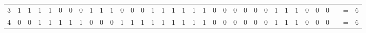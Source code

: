 \documentclass[a4paper,3p,times,authoryear]{elsarticle}
\begin{document}
\begin{table}[H]
{\begin{tabular}{|l|l|l|l|l|l|l|l|l|l|l|l|l|l|l|l|l|l|l|l|l|l|l|l|l|l|l|l|l|l|l|llll|}
\cline{1-32}\cline{34-35}
\multicolumn{1}{|c|}{3} & \multicolumn{1}{c|}{\cellcolor{blue!25}1} & \multicolumn{1}{c|}{\cellcolor{blue!25}1} & \multicolumn{1}{c|}{1} & \multicolumn{1}{c|}{1} & \multicolumn{1}{c|}{0} & \multicolumn{1}{c|}{0} & \multicolumn{1}{c|}{0} & \multicolumn{1}{c|}{\cellcolor{blue!25}1} & \multicolumn{1}{c|}{\cellcolor{blue!25}1} & \multicolumn{1}{c|}{\cellcolor{blue!25}1} & \multicolumn{1}{c|}{0} & \multicolumn{1}{c|}{0} & \multicolumn{1}{c|}{0} & \multicolumn{1}{c|}{\cellcolor{blue!25}1} & \multicolumn{1}{c|}{\cellcolor{blue!25}1} & \multicolumn{1}{c|}{\cellcolor{blue!25}1} & \multicolumn{1}{c|}{\cellcolor{blue!25}1} & \multicolumn{1}{c|}{\cellcolor{blue!25}1} & \multicolumn{1}{c|}{\cellcolor{blue!25}1} & \multicolumn{1}{c|}{0} & \multicolumn{1}{c|}{0} & \multicolumn{1}{c|}{0} & \multicolumn{1}{c|}{0} & \multicolumn{1}{c|}{0} & \multicolumn{1}{c|}{0} & \multicolumn{1}{c|}{\cellcolor{blue!25}1} & \multicolumn{1}{c|}{\cellcolor{blue!25}1} & \multicolumn{1}{c|}{\cellcolor{blue!25}1} & \multicolumn{1}{c|}{0} & \multicolumn{1}{c|}{0} & \multicolumn{1}{c}{0} & \multicolumn{1}{c}{} & \multicolumn{1}{c}{=} & \multicolumn{1}{c|}{\cellcolor{blue!25}6} \\ 
\cline{1-32}\cline{34-35}
\multicolumn{1}{|c|}{4} & \multicolumn{1}{c|}{0} & \multicolumn{1}{c|}{0} & \multicolumn{1}{c|}{\cellcolor{blue!25}1} & \multicolumn{1}{c|}{\cellcolor{blue!25}1} & \multicolumn{1}{c|}{\cellcolor{blue!25}1} & \multicolumn{1}{c|}{\cellcolor{blue!25}1} & \multicolumn{1}{c|}{\cellcolor{blue!25}1} & \multicolumn{1}{c|}{0} & \multicolumn{1}{c|}{0} & \multicolumn{1}{c|}{0} & \multicolumn{1}{c|}{\cellcolor{blue!25}1} & \multicolumn{1}{c|}{\cellcolor{blue!25}1} & \multicolumn{1}{c|}{\cellcolor{blue!25}1} & \multicolumn{1}{c|}{\cellcolor{blue!25}1} & \multicolumn{1}{c|}{\cellcolor{blue!25}1} & \multicolumn{1}{c|}{\cellcolor{blue!25}1} & \multicolumn{1}{c|}{\cellcolor{blue!25}1} & \multicolumn{1}{c|}{\cellcolor{blue!25}1} & \multicolumn{1}{c|}{\cellcolor{blue!25}1} & \multicolumn{1}{c|}{0} & \multicolumn{1}{c|}{0} & \multicolumn{1}{c|}{0} & \multicolumn{1}{c|}{0} & \multicolumn{1}{c|}{0} & \multicolumn{1}{c|}{0} & \multicolumn{1}{c|}{\cellcolor{blue!25}1} & \multicolumn{1}{c|}{\cellcolor{blue!25}1} & \multicolumn{1}{c|}{\cellcolor{blue!25}1} & \multicolumn{1}{c|}{0} & \multicolumn{1}{c|}{0} & \multicolumn{1}{c}{0} & \multicolumn{1}{c}{} & \multicolumn{1}{c}{=} & \multicolumn{1}{c|}{\cellcolor{blue!25}6} \\ 
\cline{1-32}\cline{34-35}

\end{tabular}}
\end{table}
\end{document}
